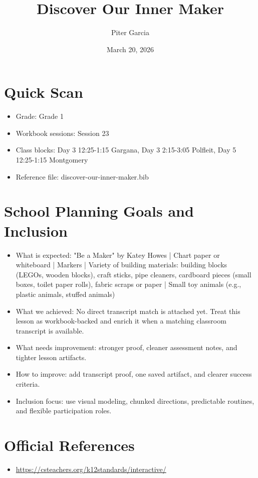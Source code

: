 \documentclass[11pt]{article}
\title{Discover Our Inner Maker}
\author{Piter Garcia}
\date{March 20, 2026}
\begin{document}
\maketitle
\section*{Quick Scan}
\begin{itemize}[leftmargin=*]
\item Grade: Grade 1
\item Workbook sessions: Session 23
\item Class blocks: Day 3 12:25-1:15 Gargana, Day 3 2:15-3:05 Polfleit, Day 5 12:25-1:15 Montgomery
\item Reference file: discover-our-inner-maker.bib
\end{itemize}
\section*{School Planning Goals and Inclusion}
\begin{itemize}[leftmargin=*]
\item What is expected: "Be a Maker" by Katey Howes | Chart paper or whiteboard | Markers | Variety of building materials: building blocks (LEGOs, wooden blocks), craft sticks, pipe cleaners, cardboard pieces (small boxes, toilet paper rolls), fabric scraps or paper | Small toy animals (e.g., plastic animals, stuffed animals)
\item What we achieved: No direct transcript match is attached yet. Treat this lesson as workbook-backed and enrich it when a matching classroom transcript is available.
\item What needs improvement: stronger proof, cleaner assessment notes, and tighter lesson artifacts.
\item How to improve: add transcript proof, one saved artifact, and clearer success criteria.
\item Inclusion focus: use visual modeling, chunked directions, predictable routines, and flexible participation roles.
\end{itemize}
\section*{Official References}
\begin{itemize}[leftmargin=*]
\item \url{https://csteachers.org/k12standards/interactive/}

\end{itemize}
\end{document}
